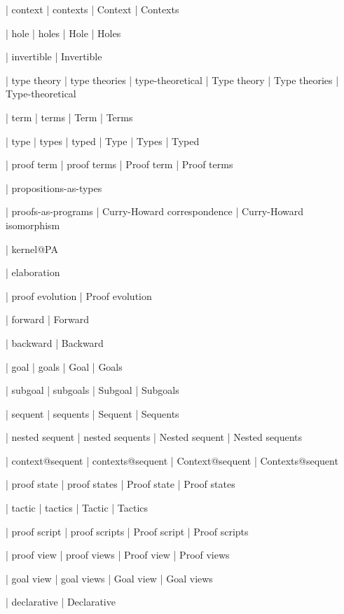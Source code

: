  | context
 | contexts
 | Context
 | Contexts

 | hole
 | holes
 | Hole
 | Holes

 | invertible
 | Invertible

 | type theory
 | type theories
 | type-theoretical
 | Type theory
 | Type theories
 | Type-theoretical

 | term
 | terms
 | Term
 | Terms

 | type
 | types
 | typed
 | Type
 | Types
 | Typed

 | proof term
 | proof terms
 | Proof term
 | Proof terms

 | propositions-as-types

 | proofs-as-programs
 | Curry-Howard correspondence
 | Curry-Howard isomorphism

 | kernel@PA

 | elaboration

 | proof evolution
 | Proof evolution

 | forward
 | Forward

 | backward
 | Backward
 
 | goal
 | goals
 | Goal
 | Goals

 | subgoal
 | subgoals
 | Subgoal
 | Subgoals

 | sequent
 | sequents
 | Sequent
 | Sequents

 | nested sequent
 | nested sequents
 | Nested sequent
 | Nested sequents

 | context@sequent
 | contexts@sequent
 | Context@sequent
 | Contexts@sequent

 | proof state
 | proof states
 | Proof state
 | Proof states

 | tactic
 | tactics
 | Tactic
 | Tactics

 | proof script
 | proof scripts
 | Proof script
 | Proof scripts

 | proof view
 | proof views
 | Proof view
 | Proof views

 | goal view
 | goal views
 | Goal view
 | Goal views

 | declarative
 | Declarative

